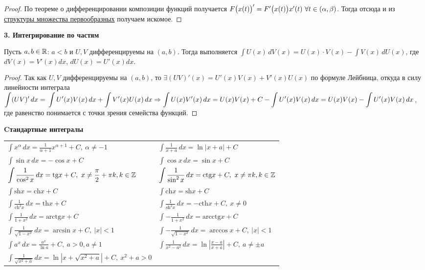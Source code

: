 \begin{proof}
    По теореме о дифференцировании композиции функций получается $\newline F \big( x (t) \big)' = F' \big( x (t) \big) x' (t) \ \forall t \in (\alpha, \beta)$. Тогда отсюда и из \hyperlink{coll6.1}{структуры множества первообразных} получаем искомое.
\end{proof}
\textbf{3. Интегрирование по частям}
\begin{theorem}
    Пусть $a, b \in \mathbb{R}$: $a < b$ и $U, V$ дифференцируемы на $(a, b)$. Тогда выполняется $\displaystyle \int U (x) \, dV(x) = U(x) \cdot V(x) - \int V (x) \, dU(x)$, где $dV(x) = V' (x) dx$, $dU(x) = U' (x) dx$.
\end{theorem}
\begin{proof}
    Так как $U, V$ дифференцируемы на $(a, b)$, то $\exists (U V)' (x) = U' (x) V (x) + V' (x) U (x)$ по формуле Лейбница, откуда в силу линейности интеграла $\displaystyle \int (U V)' \, dx = \newline \int U' (x) V (x) \, dx + \int V' (x) U (x) \, dx \Rightarrow \int U (x) V' (x) \, dx = U (x) V(x) + C - \int U' (x) V (x) \,dx = U (x) V(x) - \int U' (x) V (x) \,dx$, где равенство понимается с точки зрения семейства функций.
\end{proof}
\textbf{Cтандартные интегралы}
\begin{table}[h]
\begin{tabular}{ll}
$\displaystyle \int x^{\alpha} \, dx = \frac{1}{\alpha + 1} x^{\alpha + 1} + C, \  \alpha \neq -1$ & $\displaystyle \int \frac{1}{x + a} \, dx = \ln{|x + a|} + C$ \\
$\displaystyle \int \sin{x} \, dx = -\cos{x} + C$ & $\displaystyle \int \cos{x} \, dx = \sin{x} + C$ \\
$\displaystyle \int \frac{1}{\cos^2 {x} } \, dx = \text{tg}x + C, \  x \neq \frac{\pi}{2} + \pi k, k \in \mathbb{Z}$ & $\displaystyle \int \frac{1}{\sin^2 {x} } \, dx = \text{ctg}x + C, \  x \neq \pi k, k \in \mathbb{Z}$ \\
$\displaystyle \int \text{sh}x = \text{ch}x + C$ & $\displaystyle \int \text{ch}x = \text{sh}x + C$ \\
$\displaystyle \int \frac{1}{\text{ch}^2 x } \, dx = \text{th}x + C$ & $\displaystyle \int \frac{1}{\text{sh}^2 x } \, dx = -\text{cth}x + C, \  x \neq 0$  \\
$\displaystyle \int \frac{1}{1 + x^2} \, dx = \text{arctg} x + C$ &  $\displaystyle \int -\frac{1}{1 + x^2} \, dx = \text{arcctg} x + C$\\
$\displaystyle \int \frac{1}{\sqrt{1 - x^2}} \, dx = \arcsin{x} + C, \  |x| < 1$ &  $\displaystyle \int -\frac{1}{\sqrt{1 - x^2}} \, dx = \arccos{x} + C, \  |x| < 1$\\
$\displaystyle \int a^{x} \, dx = \frac{a^{x}}{\ln{a}} + C, \  a > 0, a \neq 1$ & $\displaystyle \int \frac{1}{x^{2} - a^{2}} \, dx = \ln{|\frac{x - a}{x + a}|} + C, \  a \neq \pm a$ \\
$\displaystyle \int \frac{1}{\sqrt{x^{2} + a}} \, dx = \ln{|x + \sqrt{x^{2} + a}|} + C, \  x^{2} + a > 0$ & 
\end{tabular}
\end{table}

